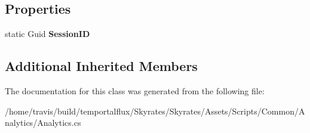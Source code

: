 \subsection*{Properties}
\begin{DoxyCompactItemize}
\item 
\hypertarget{class_analytics_a7eaa2e3237e9443cc2d69e6f1eb1b5a0}{static Guid {\bfseries Session\-I\-D}}\label{class_analytics_a7eaa2e3237e9443cc2d69e6f1eb1b5a0}

\end{DoxyCompactItemize}
\subsection*{Additional Inherited Members}


The documentation for this class was generated from the following file\-:\begin{DoxyCompactItemize}
\item 
/home/travis/build/temportalflux/\-Skyrates/\-Skyrates/\-Assets/\-Scripts/\-Common/\-Analytics/Analytics.\-cs\end{DoxyCompactItemize}
